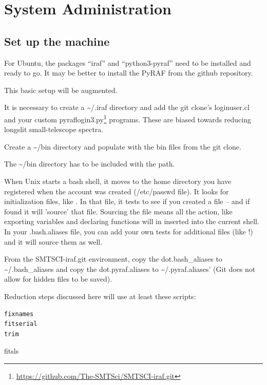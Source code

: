 \clearpage
\renewcommand{\footerfilename}{SystemAdministration.tex}

\section{System Administration} \label{sec:SystemAdministration}

\subsection{Set up the machine}

For Ubuntu, the packages ``iraf'' and ``python3-pyraf'' need to be installed and
ready to go. It may be better to install the PyRAF from the github repository.

This basic setup will be augmented.

It is necessary to create a {\textasciitilde{}/.iraf} directory and
add the git clone's loginuser.cl and your custom
pyraflogin3.py\footnote{\url{https://github.com/The-SMTSci/SMTSCI-iraf.git}}
programs. These are biased towards reducing longslit small-telescope
spectra.

Create a {\textasciitilde{}/bin} directory and populate with the bin
files from the git clone.

The {\textasciitilde{}/bin} directory has to be included with the path.

When Unix starts a bash shell, it moves to the home directory you have
registered when the account was created (/etc/passwd file). It looks
for initialization files, like . In that file, it tests to
see if you created a  file -- and if found it will
'source' that file. Sourcing the file means all the action, like
exporting variables and declaring functions will in inserted into
the current shell. In your .bash.aliases file, you can add your
own tests for additional files (like !) and it
will source them as well.

From the SMTSCI-iraf.git environment, copy the dot.bash\_aliases to
{\textasciitilde{}/.bash\_aliases} and copy the dot.pyraf.aliases to
{\textasciitilde{}/.pyraf.aliases}' (Git does not allow for hidden
files to be saved).

Reduction steps discussed here will use at least these scripts:

\begingroup \fontsize{10pt}{10pt}
\selectfont
\begin{verbatim} 
fixnames
fitserial
trim
\end{verbatim}
\endgroup
fitsls
